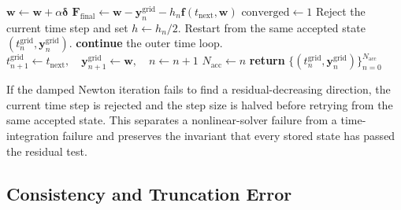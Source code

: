 \documentclass[11pt,a4paper]{article}
\theoremstyle{definition}
\theoremstyle{remark}
\begin{document}
\begin{algorithm}[htbp]
\begin{algorithmic}[1]
        \ENDIF
        \STATE $\mathbf{w} \gets \mathbf{w} + \alpha \boldsymbol{\delta}$
    \ENDFOR
    \STATE $\mathbf{F}_{\mathrm{final}} \gets \mathbf{w} - \mathbf{y}_n^{\mathrm{grid}} - h_n \mathbf{f}(t_{\text{next}}, \mathbf{w})$
        \STATE $\text{converged} \gets 1$
    \ENDIF
        \STATE Reject the current time step and set $h\gets h_n/2$.
        \STATE Restart from the same accepted state $(t_n^{\mathrm{grid}},\mathbf{y}_n^{\mathrm{grid}})$.
        \STATE \textbf{continue} the outer time loop.
    \ENDIF
    \STATE $t_{n+1}^{\mathrm{grid}} \gets t_{\text{next}},\quad \mathbf{y}_{n+1}^{\mathrm{grid}} \gets \mathbf{w},\quad n\gets n+1$
\ENDWHILE
\STATE $N_{\mathrm{acc}} \gets n$
\STATE \textbf{return} $\{(t_n^{\mathrm{grid}},\mathbf{y}_n^{\mathrm{grid}})\}_{n=0}^{N_{\mathrm{acc}}}$
\end{algorithmic}
\end{algorithm}

If the damped Newton iteration fails to find a residual-decreasing
direction, the current time step is rejected and the step size is
halved before retrying from the same accepted state. This separates a
nonlinear-solver failure from a time-integration failure and preserves
the invariant that every stored state has passed the residual test.



\subsection{Consistency and Truncation Error}

\label{sec:consistency_and_truncation_error}
\end{document}
